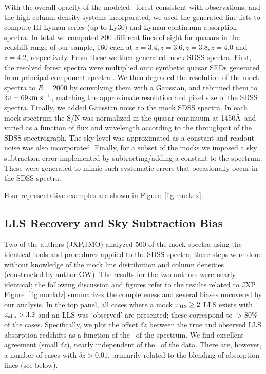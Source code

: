 \documentclass[12pt,preprint]{aastex}
\begin{document}
With the overall opacity of the modeled \lya\ forest consistent with observations, 
and the high column density systems incorporated, we used the generated line lists to compute HI Lyman series (up to Ly30) and Lyman continuum absorption spectra. In total we computed 800 different lines of sight for quasars in the redshift range of our sample, 
160 each at $z=3.4, z=3.6, z=3.8, z=4.0$ and $z=4.2$, respectively. 
From these we then generated mock SDSS spectra. First, the resolved  forest spectra were multiplied onto synthetic quasar SEDs generated from principal component spectra \citep{suzuki+05,suzuki06}. 
We then degraded the resolution of the mock spectra to $R=2000$ by convolving them with a Gaussian, and rebinned them to $\delta v=69 {\rm km~s^{-1}}$, matching the approximate 
resolution and pixel size of the SDSS spectra. Finally, we added Gaussian noise to the mock SDSS spectra. In each mock spectrum the S/N was normalized in the quasar continuum 
at 1450\AA\ and varied as a function of flux and wavelength according to the throughput of the SDSS spectrograph. The sky level was approximated as a constant and readout noise was also incorporated. 
Finally, for a subset of the mocks
we imposed a sky subtraction error implemented by subtracting/adding
a constant to the spectrum.
These were generated to mimic such systematic errors
that occasionally occur in the SDSS spectra.

Four representative examples are shown in Figure~\ref{fig:mockex}. 

\subsection{LLS Recovery and Sky Subtraction Bias}

Two of the authors (JXP,JMO) analyzed 500 of the mock spectra using
the identical tools and procedures applied to the SDSS spectra;
these steps were done without knowledge 
of the mock line distribution and column densities (constructed by author GW).
The results for the two authors were nearly identical; the following
discussion and figures refer to the results related to JXP.
Figure~\ref{fig:mockdz} summarizes the completeness and several biases
uncovered by our analysis.  In the top panel, all cases where a mock
$\tau_{\rm 912} \ge 2$ LLS exists with $z_{\rm abs} > 3.2$ and an LLS was `observed'
are presented; these correspond to $> 80\%$ of the cases.  
Specifically, we plot the offset $\delta z$
between the true and
observed LLS absorption redshifts as a function of the \sna\ of the
spectrum.  
We find excellent agreement (small $\delta z$), nearly independent
of the \sna\ of the data.
There are, however, a number of cases with $\delta z > 0.01$, primarily
related to the blending of absorption lines (see below).
\end{document}
